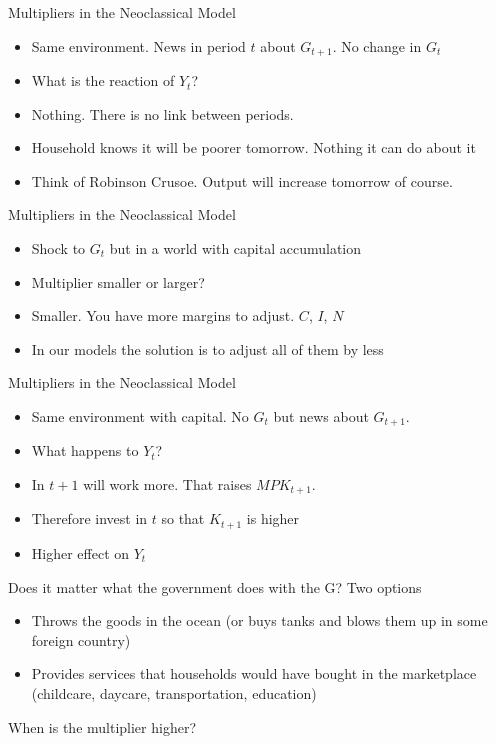 \documentclass[11pt,aspectratio=169,xcolor={dvipsnames},hyperref={pdftex,pdfpagemode=UseNone,hidelinks,pdfdisplaydoctitle=true},usepdftitle=false]{beamer}
\begin{document}
\begin{frame}{Multipliers in the Neoclassical Model}
\begin{itemize}
\item Same environment. News in period $t$ about $G_{t+1}$. No change in $G_t$
\item What is the reaction of $Y_t$?
\pause
\item Nothing. There is no link between periods.
\item Household knows it will be poorer tomorrow. Nothing it can do about it
\item Think of Robinson Crusoe. Output will increase tomorrow of course.
\end{itemize}
\end{frame}

\begin{frame}{Multipliers in the Neoclassical Model}
\begin{itemize}
\item Shock to $G_t$ but in a world with capital accumulation
\item Multiplier smaller or larger?
\pause
\item Smaller. You have more margins to adjust. $C$, $I$, $N$
\item In our models the solution is to adjust all of them by less
\end{itemize}
\end{frame}

\begin{frame}{Multipliers in the Neoclassical Model}
\begin{itemize}
\item Same environment with capital. No $G_t$ but news about $G_{t+1}$.
\item What happens to $Y_t$?
\pause
\item In $t+1$ will work more. That raises $MPK_{t+1}$.
\item Therefore invest in $t$ so that $K_{t+1}$ is higher
\item Higher effect on $Y_t$
\end{itemize}
\end{frame}



\begin{frame}{Does it matter what the government does with the G?}
Two options
\begin{itemize}
\item  Throws the goods in the ocean (or buys tanks and blows them up in some foreign country)
\item Provides services that households would have bought in the marketplace (childcare, daycare, transportation, education)
\end{itemize}
When is the multiplier higher?
\end{frame}
\end{document}
